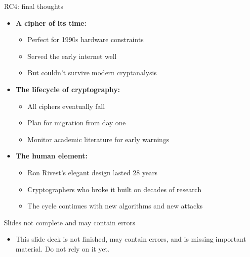 \documentclass[aspectratio=169, lualatex, handout]{beamer}
\begin{document}
\begin{frame}{RC4: final thoughts}
	\begin{itemize}[<+->]
		\item \textbf{A cipher of its time:}
		      \begin{itemize}[<+->]
			      \item Perfect for 1990s hardware constraints
			      \item Served the early internet well
			      \item But couldn't survive modern cryptanalysis
		      \end{itemize}
		\item \textbf{The lifecycle of cryptography:}
		      \begin{itemize}[<+->]
			      \item All ciphers eventually fall
			      \item Plan for migration from day one
			      \item Monitor academic literature for early warnings
		      \end{itemize}
		\item \textbf{The human element:}
		      \begin{itemize}[<+->]
			      \item Ron Rivest's elegant design lasted 28 years
			      \item Cryptographers who broke it built on decades of research
			      \item The cycle continues with new algorithms and new attacks
		      \end{itemize}
	\end{itemize}
\end{frame}

\begin{frame}{Slides not complete and may contain errors}
	\begin{itemize}
		\item This slide deck is not finished, may contain errors, and is missing important material. Do not rely on it yet.
	\end{itemize}
\end{frame}

\begin{frame}[plain]
	\titlepage
\end{frame}
\end{document}
